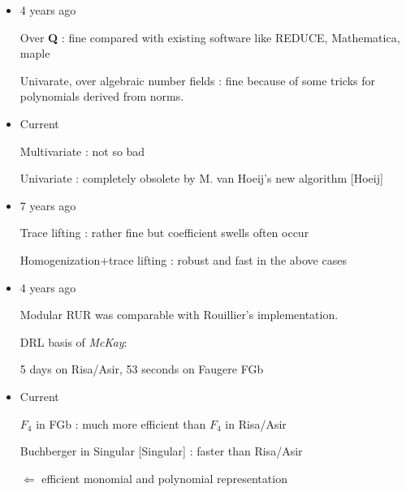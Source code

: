 \begin{slide}{}

\begin{itemize}
\item 4 years ago

Over {\bf Q} : fine compared with existing software
like REDUCE, Mathematica, maple

Univarate, over algebraic number fields :
fine because of some tricks for polynomials
derived from norms.

\item Current

Multivariate : not so bad

Univariate : completely obsolete by M. van Hoeij's new algorithm
[Hoeij]
\end{itemize}

\end{slide}

\begin{slide}{}

\begin{itemize}
\item 7 years ago

Trace lifting : rather fine but coefficient swells often occur

Homogenization+trace lifting : robust and fast in the above cases

\item 4 years ago

Modular RUR was comparable with Rouillier's implementation.

DRL basis of {\it McKay}: 

5 days on Risa/Asir, 53 seconds on Faugere FGb
\item Current

$F_4$ in FGb : much more efficient than $F_4$ in Risa/Asir

Buchberger in Singular [Singular] : faster than Risa/Asir

$\Leftarrow$ efficient monomial and polynomial representation

\end{itemize}
\end{slide}


